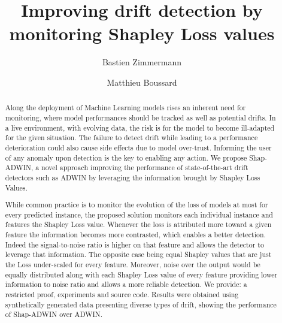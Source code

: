 \documentclass[runningheads]{llncs}
\begin{document}
%
\title{Improving drift detection by monitoring Shapley Loss values}
%
%
\author{Bastien Zimmermann \and
Matthieu Boussard}
%
%
%
\maketitle %
%
\begin{abstract}
Along the deployment of Machine Learning models rises an inherent need for monitoring, where model performances should be tracked as well as potential drifts. In a live environment, with evolving data, the risk is for the model to become ill-adapted for the given situation.
The failure to detect drift while leading to a performance deterioration could also cause side effects due to model over-trust. Informing the user of any anomaly upon detection is the key to enabling any action.
We propose Shap-ADWIN, a novel approach improving the performance of state-of-the-art drift detectors such as ADWIN by leveraging the information brought by Shapley Loss Values.

While common practice is to monitor the evolution of the loss of models at most for every predicted instance, the proposed solution monitors each individual instance and features the Shapley Loss value. Whenever the loss is attributed more toward a given feature the information becomes more contrasted, which enables a better detection. Indeed the signal-to-noise ratio is higher on that feature and allows the detector to leverage that information. The opposite case being equal Shapley values that are just the Loss under-scaled for every feature. Moreover, noise over the output would be equally distributed along with each Shapley Loss value of every feature providing lower information to noise ratio and allows a more reliable detection. We provide: a restricted proof, experiments and source code. Results were obtained using synthetically generated data presenting diverse types of drift, showing the performance of Shap-ADWIN over ADWIN.

\end{abstract}
%
%
%
\end{document}

